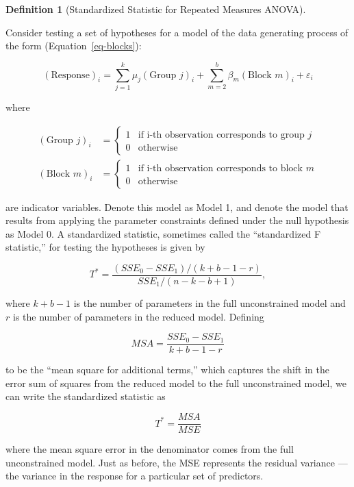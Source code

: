 \documentclass[
  letterpaper,
  DIV=11,
  numbers=noendperiod]{scrreprt}
\theoremstyle{plain}
\theoremstyle{definition}
\theoremstyle{definition}
\newtheorem{definition}{Definition}[chapter]
\theoremstyle{remark}
\begin{document}
\begin{definition}[Standardized Statistic for Repeated Measures
ANOVA]\protect\hypertarget{def-blocks-f}{}\label{def-blocks-f}

Consider testing a set of hypotheses for a model of the data generating
process of the form (Equation~\ref{eq-blocks}):

\[(\text{Response})_i = \sum_{j=1}^{k} \mu_j (\text{Group } j)_i + \sum_{m=2}^{b} \beta_m (\text{Block } m)_i + \varepsilon_i\]

where

\[
\begin{aligned}
  (\text{Group } j)_i 
    &= \begin{cases} 1 & \text{if i-th observation corresponds to group } j \\ 0 & \text{otherwise} \end{cases} \\
  (\text{Block } m)_i
    &= \begin{cases} 1 & \text{if i-th observation corresponds to block } m \\ 0 & \text{otherwise} \end{cases}
\end{aligned}
\]

are indicator variables. Denote this model as Model 1, and denote the
model that results from applying the parameter constraints defined under
the null hypothesis as Model 0. A standardized statistic, sometimes
called the ``standardized F statistic,'' for testing the hypotheses is
given by

\[T^* = \frac{\left(SSE_0 - SSE_1\right) / (k + b - 1 - r)}{SSE_1 / (n - k - b + 1)},\]

where \(k + b - 1\) is the number of parameters in the full
unconstrained model and \(r\) is the number of parameters in the reduced
model. Defining

\[MSA = \frac{SSE_0 - SSE_1}{k + b - 1 - r}\]

to be the ``mean square for additional terms,'' which captures the shift
in the error sum of squares from the reduced model to the full
unconstrained model, we can write the standardized statistic as

\[T^* = \frac{MSA}{MSE}\]

where the mean square error in the denominator comes from the full
unconstrained model. Just as before, the MSE represents the residual
variance --- the variance in the response for a particular set of
predictors.

\end{definition}
\end{document}
